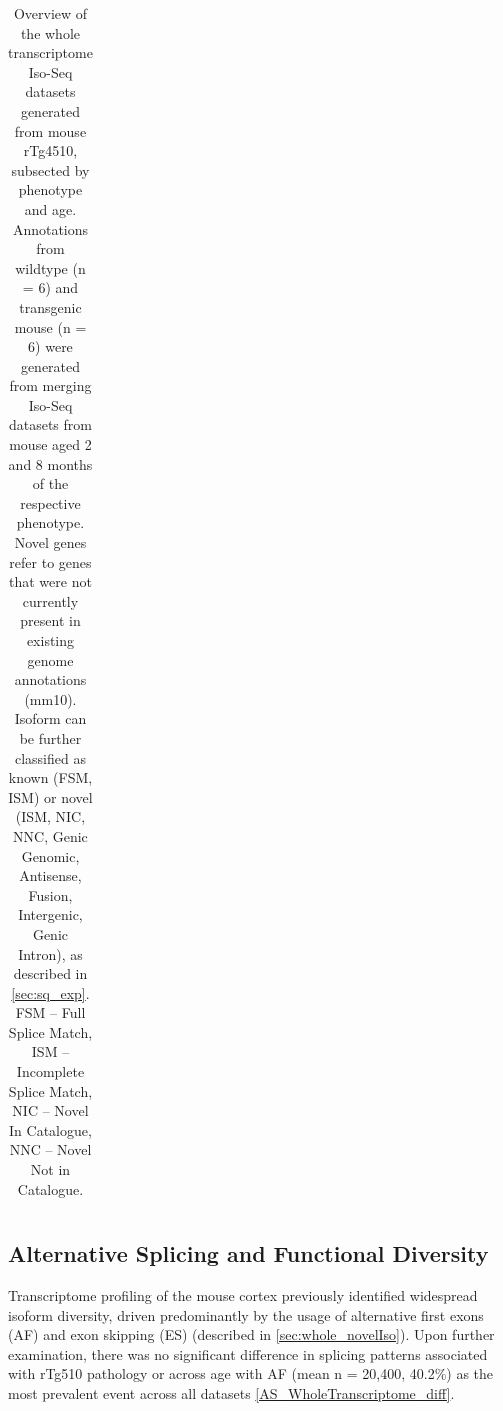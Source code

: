 \begin{landscape}
\begin{table}[]
{\begin{tabular}{@{}ccccccc@{}}
			\end{tabular}%
		}
	\caption[Overview of the whole transcriptome Iso-Seq datasets generated from mouse rTg4510, subsected by phenotype and age]%
	{Overview of the whole transcriptome Iso-Seq datasets generated from mouse rTg4510, subsected by phenotype and age. Annotations from wildtype (n = 6) and transgenic mouse (n = 6) were generated from merging Iso-Seq datasets from mouse aged 2 and 8 months of the respective phenotype. Novel genes refer to genes that were not currently present in existing genome annotations (mm10). Isoform can be further classified as known (FSM, ISM) or novel (ISM, NIC, NNC, Genic Genomic, Antisense, Fusion, Intergenic, Genic Intron), as described in \cref{sec:sq_exp}. FSM – Full Splice Match, ISM – Incomplete Splice Match, NIC – Novel In Catalogue, NNC – Novel Not in Catalogue.}
	\label{tab:isoseq_whole_subsqantioutput}
		\end{table}
\end{landscape}

\subsection{Alternative Splicing and Functional Diversity}
Transcriptome profiling of the mouse cortex previously identified widespread isoform diversity, driven predominantly by the usage of alternative first exons (AF) and exon skipping (ES) (described in \cref{sec:whole_novelIso}). Upon further examination, there was no significant difference in splicing patterns associated with rTg510 pathology or across age with AF (mean n = 20,400, 40.2\%) as the most prevalent event across all datasets \cref{AS_WholeTranscriptome_diff}. 


